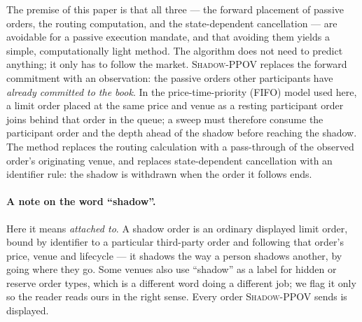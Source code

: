 \documentclass[11pt]{article}
\newcommand{\pov}{\textsc{Shadow-PPOV}}
\begin{document}
The premise of this paper is that all three --- the forward placement of passive
orders, the routing computation, and the state-dependent cancellation --- are
avoidable for a passive execution mandate, and that avoiding them yields a
simple, computationally light method. The algorithm
does not need to predict anything; it only has to follow the market. \pov{}
replaces the forward commitment with an observation: the passive orders other
participants have \emph{already committed to the book}.
In the price-time-priority (FIFO) model used here, a limit order placed at the
same price and venue as a resting participant order joins behind that order in
the queue; a sweep must therefore consume the participant order and the depth
ahead of the shadow before reaching the shadow. The
method replaces the routing calculation with a pass-through of the observed
order's originating venue, and replaces state-dependent cancellation with an
identifier rule: the shadow is withdrawn when the order it follows ends.

\paragraph{A note on the word ``shadow''.} Here it means \emph{attached to}. A
shadow order is an ordinary displayed limit order, bound by identifier to a
particular third-party order and following that order's price, venue and
lifecycle --- it shadows the way a person shadows another, by going where they
go. Some venues also use ``shadow'' as a label for hidden or reserve order
types, which is a different word doing a different job; we flag it only so the
reader reads ours in the right sense. Every order \pov{} sends is displayed.
\end{document}
